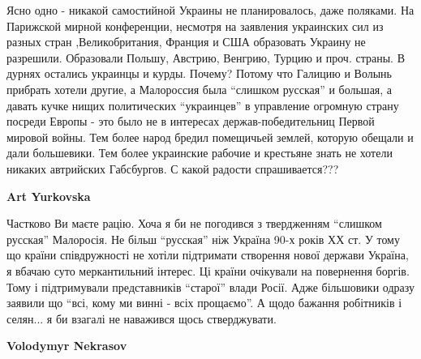 \begin{itemize}
\begin{itemize} %

Ясно одно - никакой самостийной Украины не планировалось, даже поляками. На
Парижской мирной конференции, несмотря на заявления украинских сил из разных
стран ,Великобритания, Франция и США образовать Украину не разрешили.
Образовали Польшу, Австрию, Венгрию, Турцию и проч. страны. В дурнях остались
украинцы и курды. Почему? Потому что Галицию и Волынь прибрать хотели другие, а
Малороссия была \enquote{слишком русская} и большая, а давать кучке нищих политических
\enquote{украинцев} в управление огромную страну посреди Европы - это было не в
интересах держав-победительниц Первой мировой войны. Тем более народ бредил
помещичьей землей, которую обещали и дали большевики. Тем более украинские
рабочие и крестьяне знать не хотели никаких автрийских Габсбургов. С какой
радости спрашивается???

\begin{itemize} %
\textbf{Art Yurkovska} 

Частково Ви маєте рацію. Хоча я би не погодився з твердженням \enquote{слишком русская}
Малоросія. Не більш \enquote{русская} ніж Україна 90-х років ХХ ст. У тому що країни
співдружності не хотіли підтримати створення нової держави Україна, я вбачаю
суто меркантильний інтерес. Ці країни очікували на повернення боргів. Тому і
підтримували представників \enquote{старої} влади Росії. Адже більшовики одразу заявили
що \enquote{всі, кому ми винні - всіх прощаємо}. А щодо бажання робітників і селян... я
би взагалі не наважився щось стверджувати.

\textbf{Volodymyr Nekrasov} 


\end{itemize}
\end{itemize}
\end{itemize}
